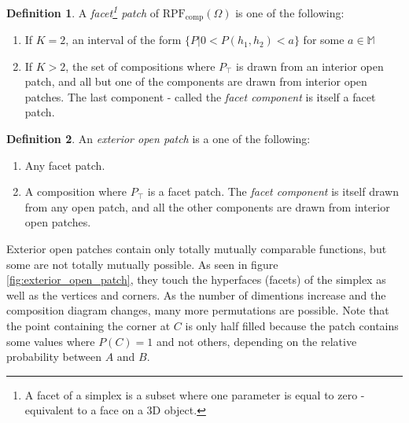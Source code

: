 \documentclass[twoside]{article}
\theoremstyle{plain}%
\theoremstyle{definition}
\newtheorem{definition}{Definition}[section]
\theoremstyle{remark}
\begin{document}
\begin{definition}
A \textit{facet\footnote{A facet of a simplex is a subset where one parameter is equal to zero - equivalent to a face on a 3D object.} patch} of \(\text{RPF}_{\text{comp}}(\Omega)\) is one of the following:

\begin{enumerate}
  \item If \(K = 2\), an interval of the form \(\{P | 0 < P(h_1, h_2) < a\}\) for some \(a \in \mathbb{M}\) 
  \item If \(K > 2\), the set of compositions where \(P_{\top}\) is drawn from an interior open patch, and all but one of the components are drawn from interior open patches. The last component - called the \textit{facet component} is itself a facet patch.
\end{enumerate}
\end{definition}

\begin{definition}
An \textit{exterior open patch} is a one of the following:

\begin{enumerate}
  \item Any facet patch.
  \item A composition where \(P_{\top}\) is a facet patch. The \textit{facet component} is itself drawn from any open patch, and all the other components are drawn from interior open patches.
\end{enumerate}
\end{definition}

Exterior open patches contain only totally mutually comparable functions, but some are not totally mutually possible. As seen in figure \ref{fig:exterior_open_patch}, they touch the hyperfaces (facets) of the simplex as well as the vertices and corners.  As the number of dimentions increase and the composition diagram changes, many more permutations are possible. Note that the point containing the corner at \(C\) is only half filled because the patch contains some values where \(P(C) = 1\) and not others, depending on the relative probability between \(A\) and \(B\).
\end{document}

